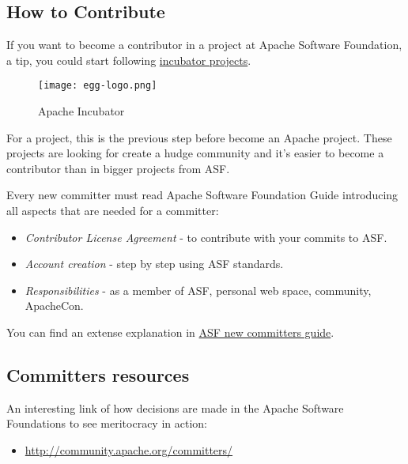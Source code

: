 \subsection{How to Contribute}

\par If you want to become a contributor in a project at Apache Software Foundation, a tip, you could start following \href{http://incubator.apache.org/}{incubator projects}.

\begin{figure}[htp]
\centering
\texttt{[image: egg-logo.png]}
\caption{Apache Incubator}
\label{}
\end{figure}

\par For a project, this is the previous step before become an Apache project. These projects are looking for create a hudge community and it's easier to become a contributor than in bigger projects from ASF.

\par Every new committer must read Apache Software Foundation Guide introducing all aspects that are needed for a committer:

\begin{itemize}
	\item \textit{Contributor License Agreement} - to contribute with your commits to ASF.
	\item \textit{Account creation} - step by step using ASF standards.
	\item \textit{Responsibilities} - as a member of ASF, personal web space, community, ApacheCon.
\end{itemize} You can find an extense explanation in \href{http://www.apache.org/dev/new-committers-guide.html}{ASF new committers guide}.

\subsection{Committers resources}

\par An interesting link of how decisions are made in the Apache Software Foundations to see meritocracy in action:
\begin{itemize}
	\item \url{http://community.apache.org/committers/}
\end{itemize}

